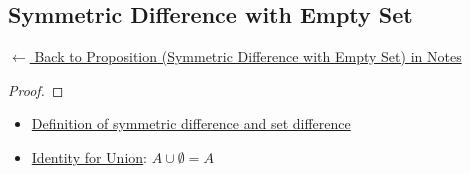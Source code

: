 
\subsection*{Symmetric Difference with Empty Set}
\label{prf:symmdiff-empty}

\begin{remark*}[Return]
\hyperref[prop:symmdiff-empty]{$\leftarrow$ Back to Proposition (Symmetric Difference with Empty Set) in Notes}
\end{remark*}

\begin{proof}
\end{proof}

\begin{remark*}

\end{remark*}

\begin{remark*}[Dependencies]
\begin{itemize}
  \item \hyperref[def:set-operations]{Definition of symmetric difference and set difference}
  \item \hyperref[prop:identity-union]{Identity for Union}: $A\cup\emptyset = A$
\end{itemize}

\end{remark*}

